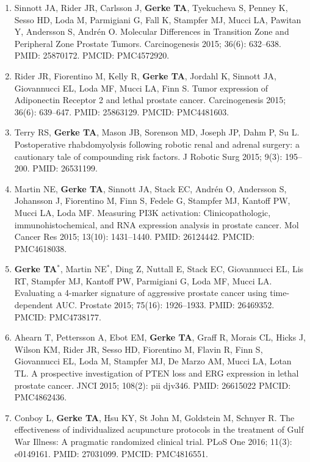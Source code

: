 \documentclass[11pt, a4paper]{article} %
\begin{document}
\begin{enumerate}[leftmargin=*]
\item{} Sinnott JA, Rider JR, Carlsson J, {\bf Gerke TA}, Tyekucheva S, Penney K, Sesso HD, Loda M, Parmigiani G, Fall K, Stampfer MJ, Mucci LA, Pawitan Y, Andersson S, Andr\'{e}n O. Molecular Differences in Transition Zone and Peripheral Zone Prostate Tumors. Carcinogenesis 2015; 36(6): 632--638. PMID: 25870172. PMCID: PMC4572920.

\item{} Rider JR, Fiorentino M, Kelly R, {\bf Gerke TA}, Jordahl K, Sinnott JA, Giovannucci EL, Loda MF, Mucci LA, Finn S. Tumor expression of {Adiponectin Receptor 2} and lethal prostate cancer. Carcinogenesis 2015; 36(6): 639--647. PMID: 25863129. PMCID: PMC4481603.

\item{} Terry RS, {\bf Gerke TA}, Mason JB, Sorenson MD, Joseph JP, Dahm P, Su L. Postoperative rhabdomyolysis following robotic renal and adrenal surgery: a cautionary tale of compounding risk factors. J Robotic Surg 2015; 9(3): 195--200. PMID: 26531199.

\item{} Martin NE, {\bf Gerke TA}, Sinnott JA, Stack EC, Andr\'{e}n O, Andersson S, Johansson J, Fiorentino M, Finn S, Fedele G, Stampfer MJ, Kantoff PW, Mucci LA, Loda MF. Measuring PI3K activation: Clinicopathologic, immunohistochemical, and RNA expression analysis in prostate cancer. Mol Cancer Res 2015; 13(10): 1431--1440. PMID: 26124442. PMCID: PMC4618038.

\item{} {\bf Gerke TA$^*$}, Martin NE$^*$, Ding Z, Nuttall E, Stack EC, Giovannucci EL, Lis RT, Stampfer MJ, Kantoff PW, Parmigiani G, Loda MF, Mucci LA. Evaluating a 4-marker signature of aggressive prostate cancer using time-dependent AUC. Prostate 2015; 75(16): 1926--1933. PMID: 26469352. PMCID: PMC4738177.

\item{} Ahearn T, Pettersson A, Ebot EM, {\bf Gerke TA}, Graff R, Morais CL, Hicks J, Wilson KM, Rider JR, Sesso HD, Fiorentino M, Flavin R, Finn S, Giovannucci EL, Loda M, Stampfer MJ, De Marzo AM, Mucci LA, Lotan TL. A prospective investigation of PTEN loss and ERG expression in lethal prostate cancer. JNCI 2015; 108(2): pii djv346. PMID: 26615022 PMCID: PMC4862436.

\item{} Conboy L, {\bf Gerke TA}, Hsu KY, {St John} M, Goldstein M, Schnyer R. The effectiveness of individualized acupuncture protocols in the treatment of Gulf War Illness: A pragmatic randomized clinical trial. PLoS One 2016; 11(3): e0149161. PMID: 27031099. PMCID: PMC4816551.


\end{enumerate}
\end{document}
